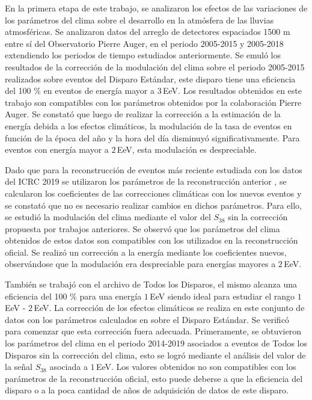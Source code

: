 
En la primera etapa de este trabajo, se analizaron los efectos de las variaciones de los parámetros del clima sobre el desarrollo en la atmósfera de las lluvias atmosféricas. Se analizaron datos del arreglo de detectores espaciados 1500 m entre sí del Observatorio Pierre Auger, en el periodo 2005-2015 y 2005-2018 extendiendo los periodos de tiempo estudiados anteriormente. Se emuló los resultados de la corrección de la modulación del clima sobre el periodo 2005-2015 realizados sobre eventos del Disparo Estándar, este disparo tiene una eficiencia del 100 \% en eventos de energía mayor a $3\,$EeV. Los resultados obtenidos en este trabajo son compatibles con los parámetros obtenidos por la colaboración Pierre Auger. Se constató que luego de realizar la corrección a la estimación de la energía debida a los efectos climáticos, la modulación de la tasa de eventos en función de la época del año y la hora del día disminuyó significativamente. Para eventos con energía mayor a $2\,$EeV, esta modulación es despreciable.

Dado que para la reconstrucción de eventos más reciente estudiada con los datos del ICRC 2019 se utilizaron los parámetros de la reconstrucción anterior \cite{aab2017impact}, se calcularon los coeficientes de las correcciones climáticas con los nuevos eventos y se constató que no es necesario realizar cambios en dichos parámetros.  Para ello, se estudió la modulación del clima mediante el valor del $S_{38}$ sin la corrección propuesta por trabajos anteriores. Se observó que los parámetros del clima obtenidos de estos datos son compatibles con los utilizados en la reconstrucción oficial. Se realizó un corrección a la energía mediante los coeficientes nuevos, observándose que la modulación era despreciable para energías mayores a $2\,$EeV. 

También se trabajó con el archivo de Todos los Disparos, el mismo alcanza una eficiencia del 100 \% para una energía $1\,$EeV siendo ideal para estudiar el rango $1\,$EeV - $2\,$EeV. La corrección de los efectos climáticos se realiza en este conjunto de datos con los parámetros calculados en \cite{aab2017impact} sobre el Disparo Estándar. Se verificó para comenzar que esta corrección fuera adecuada. Primeramente, se obtuvieron los parámetros del clima en el periodo 2014-2019 asociados a eventos de Todos los Disparos sin la corrección del clima, esto se logró mediante el análisis del valor de la señal $S_{38}$ asociada a $1\,$EeV. Los valores obtenidos no son compatibles con los parámetros de la reconstrucción oficial, esto puede deberse a que la eficiencia del disparo o a la poca cantidad de años de adquisición de datos de este disparo.

